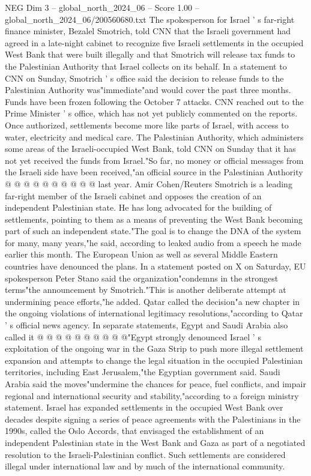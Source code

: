 \begin{textsample}{NEG Dim 3 – global\_north\_2024\_06 – Score 1.00 – global\_north\_2024\_06/200560680.txt}  \label{ex:f3_neg_382}
The spokesperson for Israel ' s far-right finance minister, Bezalel Smotrich, told CNN that the Israeli government had agreed in a late-night cabinet to recognize five Israeli settlements in the occupied West Bank that were built illegally and that Smotrich will release tax funds to the Palestinian Authority that Israel collects on its behalf.
In a statement to CNN on Sunday, Smotrich ' s office said the decision to release funds to the Palestinian Authority was"immediate"and would cover the past three months.
Funds have been frozen following the October 7 attacks.
CNN reached out to the Prime Minister ' s office, which has not yet publicly commented on the reports.
Once authorized, settlements become more like parts of Israel, with access to water, electricity and medical care.
The Palestinian Authority, which administers some areas of the Israeli-occupied West Bank, told CNN on Sunday that it has not yet received the funds from Israel."So far, no money or official messages from the Israeli side have been received,"an official source in the Palestinian Authority @ @ @ @ @ @ @ @ @ @ last year.
Amir Cohen/Reuters Smotrich is a leading far-right member of the Israeli cabinet and opposes the creation of an independent Palestinian state.
He has long advocated for the building of settlements, pointing to them as a means of preventing the West Bank becoming part of such an independent state."The goal is to change the DNA of the system for many, many years,"he said, according to leaked audio from a speech he made earlier this month.
The European Union as well as several Middle Eastern countries have denounced the plans.
In a statement posted on X on Saturday, EU spokesperson Peter Stano said the organization"condemns in the strongest terms"the announcement by Smotrich."This is another deliberate attempt at undermining peace efforts,"he added.
Qatar called the decision"a new chapter in the ongoing violations of international legitimacy resolutions,"according to Qatar ' s official news agency.
In separate statements, Egypt and Saudi Arabia also called it @ @ @ @ @ @ @ @ @ @"Egypt strongly denounced Israel ' s exploitation of the ongoing war in the Gaza Strip to push more illegal settlement expansion and attempts to change the legal situation in the occupied Palestinian territories, including East Jerusalem,"the Egyptian government said.
Saudi Arabia said the moves"undermine the chances for peace, fuel conflicts, and impair regional and international security and stability,"according to a foreign ministry statement.
Israel has expanded settlements in the occupied West Bank over decades despite signing a series of peace agreements with the Palestinians in the 1990s, called the Oslo Accords, that envisaged the establishment of an independent Palestinian state in the West Bank and Gaza as part of a negotiated resolution to the Israeli-Palestinian conflict.
Such settlements are considered illegal under international law and by much of the international community.

\end{textsample}
